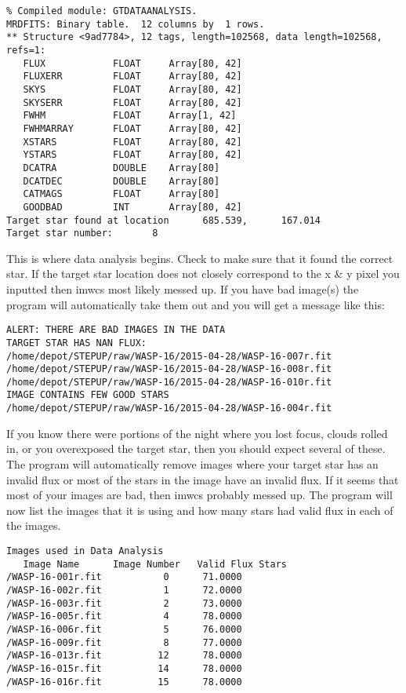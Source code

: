 \documentclass[10pt,preprint]{aastex}
\begin{document}
\begin{verbatim}
% Compiled module: GTDATAANALYSIS.
MRDFITS: Binary table.  12 columns by  1 rows.
** Structure <9ad7784>, 12 tags, length=102568, data length=102568, refs=1:
   FLUX            FLOAT     Array[80, 42]
   FLUXERR         FLOAT     Array[80, 42]
   SKYS            FLOAT     Array[80, 42]
   SKYSERR         FLOAT     Array[80, 42]
   FWHM            FLOAT     Array[1, 42]
   FWHMARRAY       FLOAT     Array[80, 42]
   XSTARS          FLOAT     Array[80, 42]
   YSTARS          FLOAT     Array[80, 42]
   DCATRA          DOUBLE    Array[80]
   DCATDEC         DOUBLE    Array[80]
   CATMAGS         FLOAT     Array[80]
   GOODBAD         INT       Array[80, 42]
Target star found at location      685.539,      167.014
Target star number:       8
\end{verbatim}

This is where data analysis begins. Check to make sure that it found the correct star. If the target star location does not closely correspond to the x \& y pixel you inputted then imwcs most likely messed up. If you have bad image(s) the program will automatically take them out and you will get a message like this:

\begin{verbatim}
ALERT: THERE ARE BAD IMAGES IN THE DATA
TARGET STAR HAS NAN FLUX:
/home/depot/STEPUP/raw/WASP-16/2015-04-28/WASP-16-007r.fit
/home/depot/STEPUP/raw/WASP-16/2015-04-28/WASP-16-008r.fit
/home/depot/STEPUP/raw/WASP-16/2015-04-28/WASP-16-010r.fit
IMAGE CONTAINS FEW GOOD STARS
/home/depot/STEPUP/raw/WASP-16/2015-04-28/WASP-16-004r.fit
\end{verbatim}

If you know there were portions of the night where you lost focus, clouds rolled in, or you overexposed the target star, then you should expect several of these. The program will automatically remove images where your target star has an invalid flux or most of the stars in the image have an invalid flux. If it seems that most of your images are bad, then imwcs probably messed up. The program will now list the images that it is using and how many stars had valid flux in each of the images. 

\begin{verbatim}
Images used in Data Analysis
   Image Name      Image Number   Valid Flux Stars
/WASP-16-001r.fit           0      71.0000
/WASP-16-002r.fit           1      72.0000
/WASP-16-003r.fit           2      73.0000
/WASP-16-005r.fit           4      78.0000
/WASP-16-006r.fit           5      76.0000
/WASP-16-009r.fit           8      77.0000
/WASP-16-013r.fit          12      78.0000
/WASP-16-015r.fit          14      78.0000
/WASP-16-016r.fit          15      78.0000
\end{verbatim}
\end{document}
